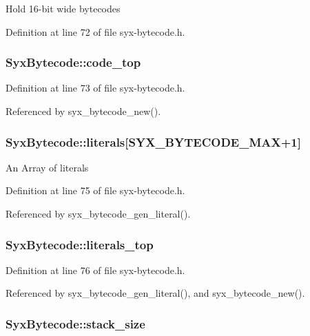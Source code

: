 Hold 16-bit wide bytecodes 

Definition at line 72 of file syx-bytecode.h.\hypertarget{struct_syx_bytecode_0a67bb938887bf5878891840d70549dc}{
\subsubsection{ {\bf SyxBytecode::code\_\-top}}}
\label{struct_syx_bytecode_0a67bb938887bf5878891840d70549dc}




Definition at line 73 of file syx-bytecode.h.

Referenced by syx\_\-bytecode\_\-new().\hypertarget{struct_syx_bytecode_116da03eb46630df968a72cd96c944ba}{
\subsubsection{ {\bf SyxBytecode::literals}\mbox{[}SYX\_\-BYTECODE\_\-MAX+1\mbox{]}}}
\label{struct_syx_bytecode_116da03eb46630df968a72cd96c944ba}


An Array of literals 

Definition at line 75 of file syx-bytecode.h.

Referenced by syx\_\-bytecode\_\-gen\_\-literal().\hypertarget{struct_syx_bytecode_8abab30c958b6ff43f846bbcddb31c33}{
\subsubsection{ {\bf SyxBytecode::literals\_\-top}}}
\label{struct_syx_bytecode_8abab30c958b6ff43f846bbcddb31c33}




Definition at line 76 of file syx-bytecode.h.

Referenced by syx\_\-bytecode\_\-gen\_\-literal(), and syx\_\-bytecode\_\-new().\hypertarget{struct_syx_bytecode_b09840b5e68800427b584f3f75a754e5}{
\subsubsection{ {\bf SyxBytecode::stack\_\-size}}}
\label{struct_syx_bytecode_b09840b5e68800427b584f3f75a754e5}



